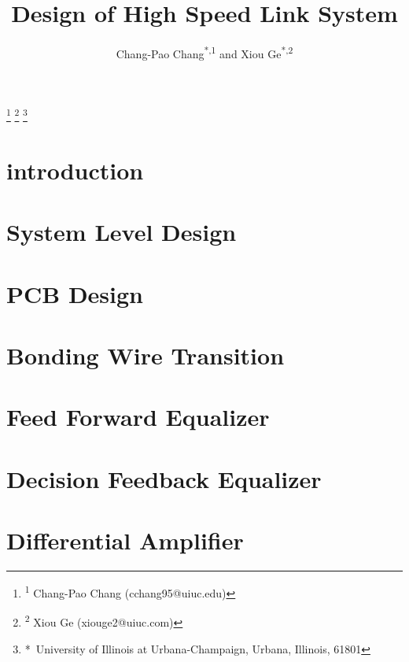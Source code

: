 \documentclass{pj}
\begin{document}
\setcounter{page}{1}
\pjheader{}

\title{Design of High Speed Link System}

\newcommand{\defaultfigurewidth}{0.5\columnwidth}

\footnote{\hskip-0.12in\textsuperscript{1} Chang-Pao Chang (cchang95@uiuc.edu)}
\footnote{\hskip-0.12in\textsuperscript{2} Xiou Ge (xiouge2@uiuc.com)}
\footnote{\hskip-0.12in*\ University of Illinois at Urbana-Champaign, Urbana, Illinois, 61801}

\author{Chang-Pao Chang\textsuperscript{*,1} and Xiou Ge\textsuperscript{*,2}}



\begin{abstract}
	
\end{abstract}
%
\section{introduction}
\label{sec:Intro}

\section{System Level Design}
\label{sec:system}

\section{PCB Design}
\label{sec:pcb_design}

\section{Bonding Wire Transition}
\label{sec:bond_wire}

\section{Feed Forward Equalizer}
\label{sec:FFE}

\section{Decision Feedback Equalizer}
\label{sec:DFE}

\section{Differential Amplifier}
\label{sec:diff_Op}
\end{document}
